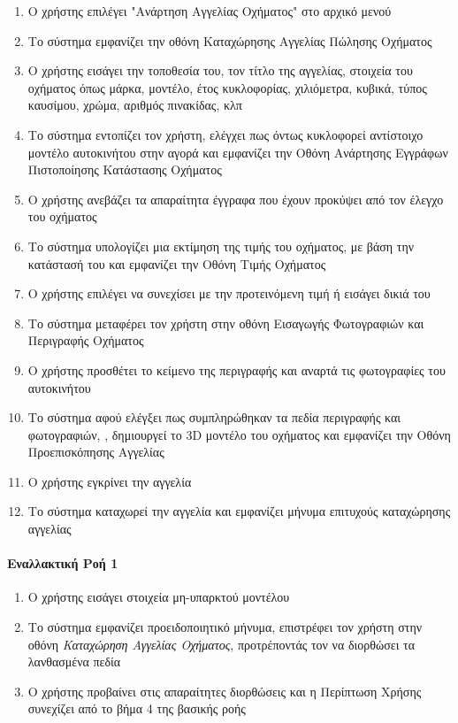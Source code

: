 \documentclass{../ol-softwaremanual}
\begin{document}
	\begin{enumerate}
		
		\item Ο χρήστης επιλέγει \en"\gr Ανάρτηση Αγγελίας Οχήματος\en" \gr στο αρχικό μενού
		\item Το σύστημα εμφανίζει την οθόνη Καταχώρησης Αγγελίας Πώλησης Οχήματος
		\item Ο χρήστης εισάγει την τοποθεσία του, τον τίτλο της αγγελίας, στοιχεία του οχήματος όπως μάρκα, μοντέλο, έτος κυκλοφορίας, χιλιόμετρα, κυβικά, τύπος καυσίμου, χρώμα, αριθμός πινακίδας, κλπ
		\item Το σύστημα εντοπίζει τον χρήστη, ελέγχει πως όντως κυκλοφορεί αντίστοιχο μοντέλο αυτοκινήτου στην αγορά και εμφανίζει την Οθόνη Ανάρτησης Εγγράφων Πιστοποίησης Κατάστασης Οχήματος
		\item Ο χρήστης ανεβάζει τα απαραίτητα έγγραφα που έχουν προκύψει από τον έλεγχο του οχήματος		
		\item Το σύστημα υπολογίζει μια εκτίμηση της τιμής του οχήματος, με βάση την κατάστασή του και εμφανίζει την Οθόνη Τιμής Οχήματος
		\item Ο χρήστης επιλέγει να συνεχίσει με την προτεινόμενη τιμή ή εισάγει δικιά του
		\item Το σύστημα μεταφέρει τον χρήστη στην οθόνη Εισαγωγής Φωτογραφιών και Περιγραφής Οχήματος
		\item Ο χρήστης προσθέτει το κείμενο της περιγραφής και αναρτά τις φωτογραφίες του αυτοκινήτου
		\item Το σύστημα αφού ελέγξει πως συμπληρώθηκαν τα πεδία περιγραφής και φωτογραφιών, , δημιουργεί το \en 3D \gr μοντέλο του οχήματος και εμφανίζει την Οθόνη Προεπισκόπησης Αγγελίας
		\item Ο χρήστης εγκρίνει την αγγελία
		\item Το σύστημα καταχωρεί την αγγελία και εμφανίζει μήνυμα επιτυχούς καταχώρησης αγγελίας
	\end{enumerate}
	
	\paragraph{Εναλλακτική Ροή 1}
	
	\begin{enumerate}
		\item O χρήστης εισάγει στοιχεία μη-υπαρκτού μοντέλου
		\item Το σύστημα εμφανίζει προειδοποιητικό μήνυμα, επιστρέφει τον χρήστη στην οθόνη \textit{Καταχώρηση Αγγελίας Οχήματος}, προτρέποντάς τον να διορθώσει τα λανθασμένα πεδία
		\item Ο χρήστης προβαίνει στις απαραίτητες διορθώσεις και η Περίπτωση Χρήσης συνεχίζει από το βήμα 4 της βασικής ροής
	\end{enumerate}
	
\end{document}
